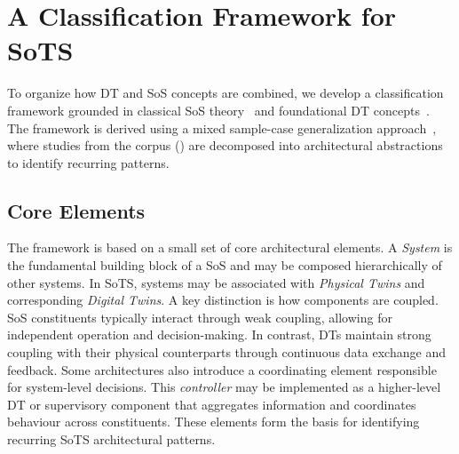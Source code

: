 \section{A Classification Framework for SoTS}\label{sec:literature-review-classification}

To organize how DT and SoS concepts are combined, we develop a classification framework grounded in classical SoS theory~\cite{maier1998architecting, maier2014role} and foundational DT concepts~\cite{kritzinger2018digital}. The framework is derived using a mixed sample-case generalization approach~\cite{jwieringa2015six}, where studies from the corpus () are decomposed into architectural abstractions to identify recurring patterns.

\subsection{Core Elements}
The framework is based on a small set of core architectural elements. A \textit{System} is the fundamental building block of a SoS and may be composed hierarchically of other systems. In SoTS, systems may be associated with \textit{Physical Twins} and corresponding \textit{Digital Twins}. A key distinction is how components are coupled. SoS constituents typically interact through weak coupling, allowing for independent operation and decision-making. In contrast, DTs maintain strong coupling with their physical counterparts through continuous data exchange and feedback. Some architectures also introduce a coordinating element responsible for system-level decisions. This \textit{controller} may be implemented as a higher-level DT or supervisory component that aggregates information and coordinates behaviour across constituents. These elements form the basis for identifying recurring SoTS architectural patterns.

